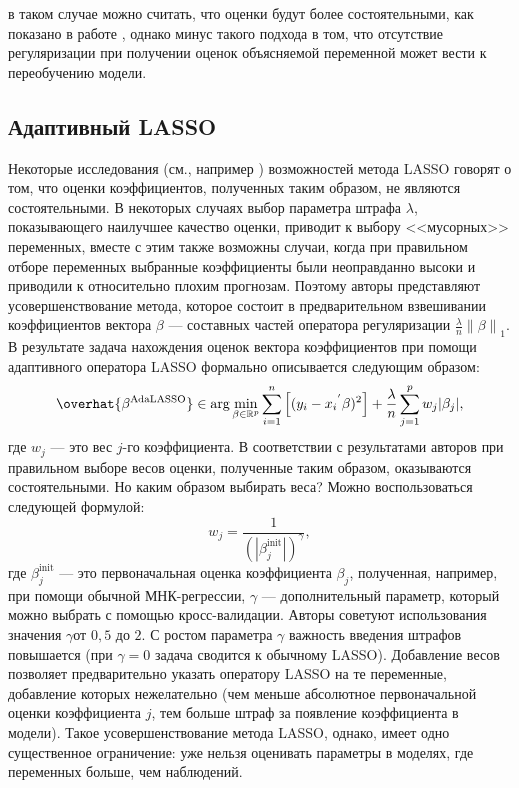 в таком случае можно считать, что оценки будут более состоятельными, как показано в работе \cite{chernozhukov2015post}
, однако минус такого подхода в том, что отсутствие регуляризации при получении оценок объясняемой переменной может вести к переобучению модели.

\subsection{Адаптивный LASSO}

Некоторые исследования (см., например \cite{zou2006adaptive})
возможностей метода LASSO говорят о том, что оценки коэффициентов, полученных таким образом, не являются состоятельными. В некоторых случаях выбор параметра штрафа $\lambda$, показывающего наилучшее качество оценки, приводит к выбору <<мусорных>> переменных, вместе с этим также возможны случаи, когда при правильном отборе переменных выбранные коэффициенты были неоправданно высоки и приводили к относительно плохим прогнозам. Поэтому авторы представляют усовершенствование метода, которое состоит в предварительном взвешивании коэффициентов вектора $\beta$ --- составных частей оператора регуляризации $\frac{\lambda}{n} \left\lVert \beta \right\rVert_1$. В результате задача нахождения оценок вектора коэффициентов при помощи адаптивного оператора LASSO формально описывается следующим образом:
\begin{equation}
\overhat{\beta^{\text{AdaLASSO}}} \in \arg \min_{\beta \in
\mathbb{R}^p} \sum_{i=1}^n \left[ (y_i - {x_i}^{'} \beta)^2 \right] +  \frac{\lambda}{n} \sum_{j=1}^p w_j |\beta_j|,
\end{equation}
где $w_j$ --- это вес $j$-го коэффициента. В соответствии с результатами авторов при правильном выборе весов оценки, полученные таким образом, оказываются состоятельными. Но каким образом выбирать веса? Можно воспользоваться следующей формулой:
\begin{equation}
w_j = \frac{1}{(|\beta_j^{\text{init}}|)^\gamma},
\end{equation}
где $\beta_j^{\text{init}}$ --- это первоначальная оценка коэффициента $\beta_j$, полученная, например, при помощи обычной МНК-регрессии,
$\gamma$ --- дополнительный параметр, который можно выбрать с помощью кросс-валидации. Авторы советуют использования значения $\gamma $от $0,5$ до $2$. С ростом параметра $\gamma$ важность введения штрафов повышается (при $\gamma = 0$ задача сводится к обычному LASSO). Добавление весов позволяет предварительно указать оператору LASSO на те переменные, добавление которых нежелательно (чем меньше  абсолютное первоначальной оценки коэффициента $j$, тем больше  штраф за появление коэффициента в модели). Такое усовершенствование метода LASSO, однако, имеет одно существенное ограничение: уже нельзя оценивать параметры в моделях, где переменных больше, чем наблюдений.


